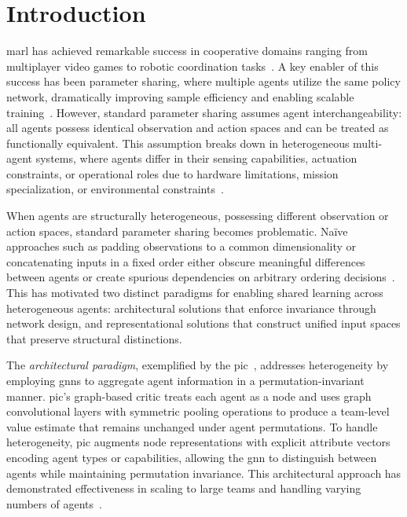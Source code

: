 \section{Introduction}

\Gls{marl} has achieved remarkable success in cooperative 
domains ranging from multiplayer video games to robotic coordination tasks~\cite{albrecht2024}. 
A key enabler of this success has been parameter sharing, where multiple agents utilize the 
same policy network, dramatically improving sample efficiency and enabling scalable 
training~\cite{gupta2017, terry2020}. However, standard parameter sharing assumes 
agent interchangeability: all agents possess identical observation and action spaces 
and can be treated as functionally equivalent. This assumption breaks down in 
heterogeneous multi-agent systems, where agents differ in their sensing capabilities, 
actuation constraints, or operational roles due to hardware limitations, 
mission specialization, or environmental constraints~\cite{calvo2018, cao2012}.

When agents are structurally heterogeneous, possessing different observation or 
action spaces, standard parameter sharing becomes problematic. 
Na\"ive approaches such as padding observations to a common dimensionality or 
concatenating inputs in a fixed order either obscure meaningful differences 
between agents or create spurious dependencies on arbitrary ordering decisions~\cite{terry2020}. 
This has motivated two distinct paradigms for enabling shared learning across heterogeneous 
agents: architectural solutions that enforce invariance through network design, and 
representational solutions that construct unified input spaces that preserve 
structural distinctions.

The \emph{architectural paradigm}, exemplified by the \gls{pic}~\cite{liu2020b}, 
addresses heterogeneity by employing \glspl{gnn} to aggregate agent 
information in a permutation-invariant manner. \Gls{pic}'s graph-based critic treats each 
agent as a node and uses graph convolutional layers with symmetric pooling operations 
to produce a team-level value estimate that remains unchanged under agent permutations. 
To handle heterogeneity, \gls{pic} augments node representations with explicit attribute 
vectors encoding agent types or capabilities, allowing the \gls{gnn} to distinguish between 
agents while maintaining permutation invariance. 
This architectural approach has demonstrated effectiveness in scaling to large teams 
and handling varying numbers of agents~\cite{liu2020b}.

